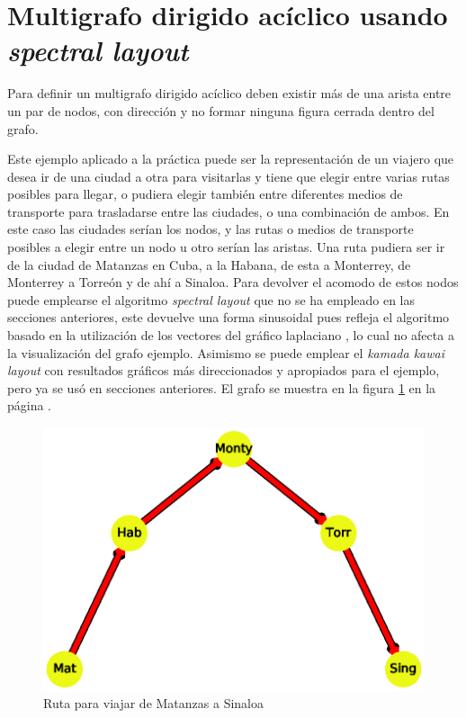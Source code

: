 \documentclass{article}
\begin{document}
\section{Multigrafo dirigido acíclico usando \textit{spectral layout}}

Para definir un multigrafo dirigido acíclico deben existir más de una arista entre un par de nodos, con dirección y no formar ninguna figura cerrada dentro del grafo. 

Este ejemplo aplicado a la práctica puede ser la representación de un viajero que desea ir de una ciudad a otra para visitarlas y tiene que elegir entre varias rutas posibles para llegar, o pudiera elegir también entre diferentes medios de transporte para trasladarse entre las ciudades, o una combinación de ambos. En este caso las ciudades serían los nodos, y las rutas o medios de transporte posibles a elegir entre un nodo u otro serían las aristas. Una ruta pudiera ser ir de la ciudad de Matanzas en Cuba, a la Habana, de esta a Monterrey, de Monterrey a Torreón y de ahí a Sinaloa. Para devolver el acomodo de estos  nodos puede emplearse el algoritmo \textit{spectral layout} que no se ha empleado en las secciones anteriores, este devuelve una forma sinusoidal pues refleja el algoritmo basado en la utilización de los vectores del gráfico laplaciano \citep{layout}, lo cual no afecta a la visualización del grafo ejemplo. Asimismo se puede emplear el \textit{kamada kawai layout} con resultados gráficos más direccionados y apropiados para el ejemplo, pero ya se usó en secciones anteriores. El grafo se muestra en la figura \ref{fig:Fig10} en la página \pageref{fig:Fig10}. 
\newpage


\begin{figure}[h]
    \centering
    \includegraphics[scale=0.6]{imagenes1/Fig10.eps}
    \caption{Ruta para viajar de Matanzas a Sinaloa}
    \label{fig:Fig10}
\end{figure}
\end{document}
